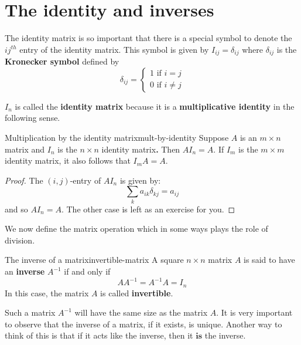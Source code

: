 \section{The identity and inverses}

The identity matrix is so important that there
is a special symbol to denote the $ij^{th}$ entry of the identity matrix. This symbol is given by 
$I_{ij}=\delta _{ij}$ where $\delta _{ij}$ is the \textbf{Kronecker symbol}
defined
 by
\begin{equation*}
\delta _{ij}=\left\{
\begin{array}{c}
1
\text{ if }i=j \\
0\text{ if }i\neq j
\end{array}
\right.
\end{equation*}

$I_n$ is called the \textbf{identity matrix} because it is a \textbf{multiplicative identity} in the following sense.

\begin{lemma}{Multiplication by the identity matrix}{mult-by-identity}
Suppose $A$ is an $m\times n$ matrix and $I_{n}$ is the $n\times n$ identity
matrix\textbf{.} Then $AI_{n}=A.$ If $I_{m}$ is the $m\times m$ identity
matrix, it also follows that $I_{m}A=A.$
\end{lemma}

\begin{proof}
The $(i,j)$-entry of $AI_n$ is given by:
\begin{equation*}
\sum_{k}a_{ik}\delta _{kj}=a_{ij}
\end{equation*}
and so $AI_{n}=A.$ The other case is left as an exercise for you. 
\end{proof}

We now define the matrix operation which in some ways plays the role of division. 

\begin{definition}{The inverse of a matrix}{invertible-matrix}
A square  $n\times n$ matrix $A$ is said to have an \textbf{inverse} $A^{-1}$
if and only if 
\begin{equation*}
AA^{-1}=A^{-1}A=I_n
\end{equation*}
In this case, the matrix $A$ is called
 \textbf{invertible}.
\end{definition}

Such a  matrix $A^{-1}$ will have the same size as the matrix $A$. 
It is very important to observe that the inverse of a matrix, if it exists,
is unique. Another way to think of this is that if it acts like the inverse,
then it $\textbf{is}$ the inverse.

